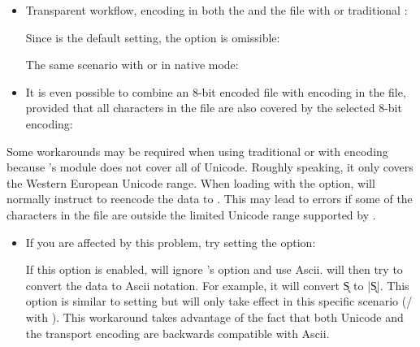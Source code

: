 \documentclass{ltxdockit}[2011/03/25]
\newcommand*{\biber}{\sty{biber}\xspace}
\newcommand*{\biblatex}{\sty{biblatex}\xspace}
\begin{document}
\begin{itemize}

\item Transparent \utf workflow, \ie \utf encoding in both the  and the  file with \pdftex or traditional \tex:

\begin{ltxexample}
\usepackage[utf8]{inputenc}
\usepackage[bibencoding=auto]{biblatex}
\end{ltxexample}
%
Since  is the default setting, the option is omissible:

\begin{ltxexample}
\usepackage[utf8]{inputenc}
\usepackage{biblatex}
\end{ltxexample}

The same scenario with \xetex or \luatex in native \utf mode:

\begin{ltxexample}
\usepackage{biblatex}
\end{ltxexample}

\item It is even possible to combine an 8-bit encoded  file with \utf encoding in the  file, provided that all characters in the  file are also covered by the selected 8-bit encoding:

\begin{ltxexample}
\usepackage[latin1]{inputenc}
\usepackage[bibencoding=utf8]{biblatex}
\end{ltxexample}

\end{itemize}

Some workarounds may be required when using traditional \tex or \pdftex with \utf encoding because 's  module does not cover all of Unicode. Roughly speaking, it only covers the Western European Unicode range. When loading  with the  option, \biblatex will normally instruct \biber to reencode the  data to \utf. This may lead to  errors if some of the characters in the  file are outside the limited Unicode range supported by .

\begin{itemize}

\item If you are affected by this problem, try setting the  option:

\begin{ltxexample}
\usepackage[utf8]{inputenc}
\usepackage[safeinputenc]{biblatex}
\end{ltxexample}
%
If this option is enabled, \biblatex will ignore 's  option and use Ascii. \biber will then try to convert the  data to Ascii notation. For example, it will convert \k{S} to |\k{S}|. This option is similar to setting  but will only take effect in this specific scenario (\slash {} with \utf). This workaround takes advantage of the fact that both Unicode and the \utf transport encoding are backwards compatible with Ascii.

\end{itemize}
\end{document}
